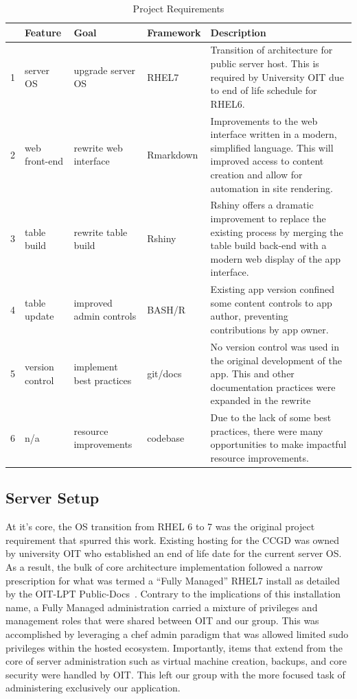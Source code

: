 \documentclass[10pt]{report}
\begin{document}
\begin{table}[H]
    \caption{Project Requirements}\label{table:projectReqs}
    \addtolength\tabcolsep{-0.2em}
    \begin{tabular}{llllp{7cm}}
        \toprule
        &Feature&Goal&Framework&Description\\
        \midrule
        1&server OS&upgrade server OS&RHEL7&Transition of architecture for public server host. This is required by University OIT due to end of life schedule for RHEL6.\\
        \midrule
        2&web front-end&rewrite web interface&Rmarkdown&Improvements to the web interface written in a modern, simplified language. This will improved access to content creation and allow for automation in site rendering.\\
        \midrule
        3&table build&rewrite table build&Rshiny&Rshiny offers a dramatic improvement to replace the existing process by merging the table build back-end with a modern web display of the app interface.\\
        \midrule
        4&table update&improved admin controls&BASH/R&Existing app version confined some content controls to app author, preventing contributions by app owner.\\
        \midrule
        5&version control&implement best practices&git/docs&No version control was used in the original development of the app. This and other documentation practices were expanded in the rewrite\\
        \midrule
        6&n/a&resource improvements&codebase&Due to the lack of some best practices, there were many opportunities to make impactful resource improvements.\\
        \bottomrule
    \end{tabular}
    \addtolength\tabcolsep{+0.2em}
\end{table}

\subsection{Server Setup}
At it's core, the OS transition from RHEL 6 to 7 was the original project requirement that spurred this work. Existing hosting for the CCGD was owned by university OIT who established an end of life date for the current server OS\@. As a result, the bulk of core architecture implementation followed a narrow prescription for what was termed a ``Fully Managed'' RHEL7 install as detailed by the OIT-LPT Public-Docs~\cite{OIT}. Contrary to the implications of this installation name, a Fully Managed administration carried a mixture of privileges and management roles that were shared between OIT and our group. This was accomplished by leveraging a chef admin paradigm that was allowed limited sudo privileges within the hosted ecosystem. Importantly, items that extend from the core of server administration such as virtual machine creation, backups, and core security were handled by OIT\@. This left our group with the more focused task of administering exclusively our application.
\end{document}
